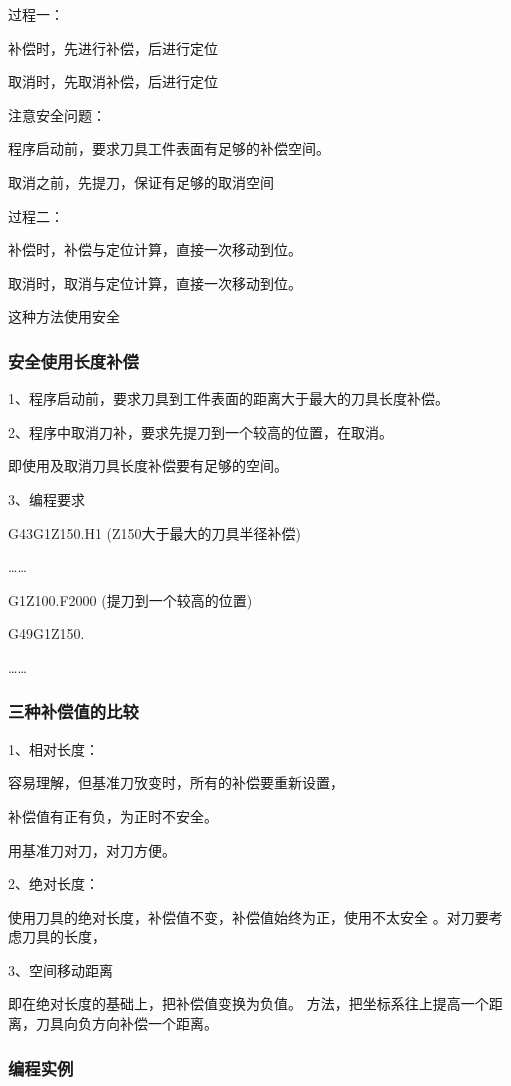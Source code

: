 	过程一：
	
	补偿时，先进行补偿，后进行定位
	
	取消时，先取消补偿，后进行定位
	
	注意安全问题：
	
	程序启动前，要求刀具工件表面有足够的补偿空间。
	
	取消之前，先提刀，保证有足够的取消空间
	
	过程二：
	
	补偿时，补偿与定位计算，直接一次移动到位。
	
	取消时，取消与定位计算，直接一次移动到位。
	
	这种方法使用安全
	
\subsubsection{安全使用长度补偿}
	
	1、程序启动前，要求刀具到工件表面的距离大于最大的刀具长度补偿。
	
	2、程序中取消刀补，要求先提刀到一个较高的位置，在取消。
	
	即使用及取消刀具长度补偿要有足够的空间。
	
	3、编程要求
	
	G43G1Z150.H1 (Z150大于最大的刀具半径补偿)
	
	……
	
	G1Z100.F2000 (提刀到一个较高的位置)
	
	G49G1Z150.
	
	……
	
\subsubsection{三种补偿值的比较}
	
	1、相对长度：
	
	容易理解，但基准刀攷变时，所有的补偿要重新设置，
	
	补偿值有正有负，为正时不安全。
	
	用基准刀对刀，对刀方便。
	
	2、绝对长度：
	
	使用刀具的绝对长度，补偿值不变，补偿值始终为正，使用不太安全
	。对刀要考虑刀具的长度，
	
	3、空间移动距离
	
	即在绝对长度的基础上，把补偿值变换为负值。
	方法，把坐标系往上提高一个距离，刀具向负方向补偿一个距离。
	
\subsubsection{编程实例}
	
